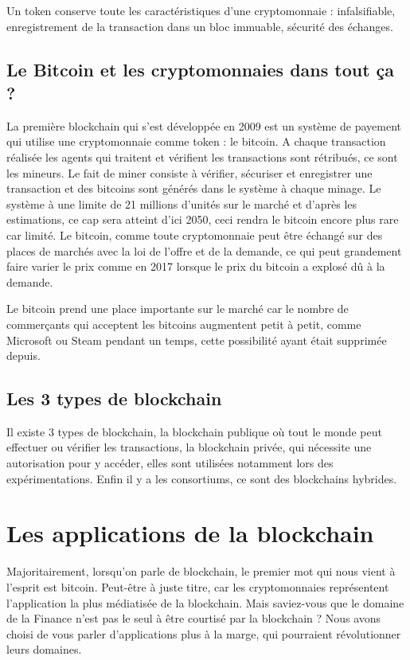 \documentclass[12pt, a4paper, oneside]{book}
\begin{document}
Un token conserve toute les caractéristiques d’une cryptomonnaie : infalsifiable, enregistrement de la transaction dans un bloc immuable, sécurité des échanges.

\section{Le Bitcoin et les cryptomonnaies dans tout ça ?}
La première blockchain qui s’est développée en 2009 est un système de payement qui utilise une cryptomonnaie comme token : le bitcoin. 
A chaque transaction réalisée les agents qui traitent et vérifient les transactions sont rétribués, ce sont les mineurs. Le fait de miner consiste à vérifier, sécuriser et enregistrer une transaction et des bitcoins sont générés dans le système à chaque minage.
 Le système à une limite de 21 millions d’unités sur le marché et d’après les estimations, ce cap sera atteint d’ici 2050, ceci rendra le bitcoin encore plus rare car limité. Le bitcoin, comme toute cryptomonnaie peut être échangé sur des places de marchés avec la loi de l’offre et de la demande, ce qui peut grandement faire varier le prix comme en 2017 lorsque le prix du bitcoin a explosé dû à la demande.

Le bitcoin prend une place importante sur le marché car le nombre de commerçants qui acceptent les bitcoins augmentent petit à petit, comme Microsoft ou Steam pendant un temps, cette possibilité ayant était supprimée depuis.

\section{Les 3 types de blockchain}

Il existe 3 types de blockchain, la blockchain publique où tout le monde peut effectuer ou vérifier les transactions, la blockchain privée, qui nécessite une autorisation pour y accéder, elles sont utilisées notamment lors des expérimentations.
Enfin il y a les consortiums, ce sont des blockchains hybrides.

    
    \chapter{Les applications de la blockchain}

    Majoritairement, lorsqu’on parle de blockchain, le premier mot qui nous vient à l’esprit est bitcoin. Peut-être à juste titre, car les cryptomonnaies représentent l’application la plus médiatisée de la blockchain. Mais saviez-vous que le domaine de la Finance n’est pas le seul à être courtisé par la blockchain ? Nous avons choisi de vous parler d’applications plus à la marge, qui pourraient révolutionner leurs domaines.
\end{document}
